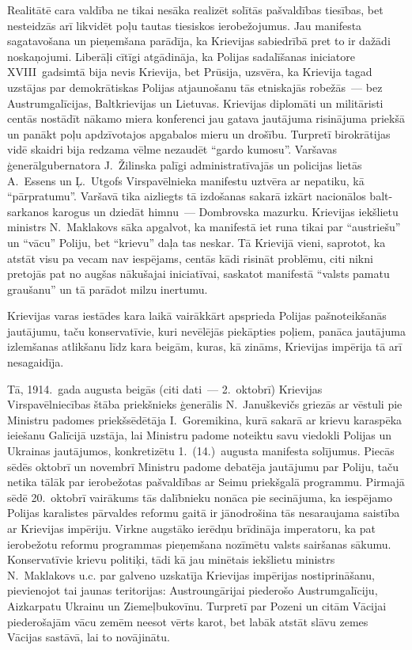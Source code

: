\documentclass[twoside,a5paper,12pt,fleqn,openany]{extbook}
\begin{document}
Realitātē cara valdība ne tikai nesāka realizēt solītās pašvaldības tiesības, bet nesteidzās arī likvidēt poļu tautas tiesiskos ierobežojumus. Jau manifesta sagatavošana un pieņemšana parādīja, ka Krievijas sabiedrībā pret to ir dažādi noskaņojumi. Liberāļi cītīgi atgādināja, ka Polijas sadalīšanas iniciatore XVIII~gadsimtā bija nevis Krievija, bet Prūsija, uzsvēra, ka Krievija tagad uzstājas par demokrātiskas Polijas atjaunošanu tās etniskajās robežās~--- bez Austrumgalīcijas, Baltkrievijas un Lietuvas. Krievijas diplomāti un militāristi centās nostādīt nākamo miera konferenci jau gatava jautājuma risinājuma priekšā un panākt poļu apdzīvotajos apgabalos mieru un drošību. Turpretī birokrātijas vidē skaidri bija redzama vēlme nezaudēt ``gardo kumosu''. Varšavas ģenerālgubernatora J.~Žilinska palīgi administratīvajās un policijas lietās A.~Essens un Ļ.~Utgofs Virspavēlnieka manifestu uztvēra ar nepatiku, kā ``pārpratumu''. Varšavā tika aizliegts tā izdošanas sakarā izkārt nacionālos balt-sarkanos karogus un dziedāt himnu~--- Dombrovska mazurku. Krievijas iekšlietu ministrs N.~Maklakovs sāka apgalvot, ka manifestā iet runa tikai par ``austriešu'' un ``vācu'' Poliju, bet ``krievu'' daļa tas neskar. Tā Krievijā vieni, saprotot, ka atstāt visu pa vecam nav iespējams, centās kādi risināt problēmu, citi nikni pretojās pat no augšas nākušajai iniciatīvai, saskatot manifestā ``valsts pamatu graušanu'' un tā parādot milzu inertumu.

Krievijas varas iestādes kara laikā vairākkārt apsprieda Polijas pašnoteikšanās jautājumu, taču konservatīvie, kuri nevēlējās piekāpties poļiem, panāca jautājuma izlemšanas atlikšanu līdz kara beigām, kuras, kā zināms, Krievijas impērija tā arī nesagaidīja.

Tā, 1914.~gada augusta beigās (citi dati~--- 2.~oktobrī) Krievijas Virspavēlniecības štāba priekšnieks ģenerālis N.~Januškevičs griezās ar vēstuli pie Ministru padomes priekšsēdētāja I.~Goremikina, kurā sakarā ar krievu karaspēka ieiešanu Galīcijā uzstāja, lai Ministru padome noteiktu savu viedokli Polijas un Ukrainas jautājumos, konkretizētu 1.~(14.)~augusta manifesta solījumus. Piecās sēdēs oktobrī un novembrī Ministru padome debatēja jautājumu par Poliju, taču netika tālāk par ierobežotas pašvaldības ar Seimu priekšgalā programmu. Pirmajā sēdē 20.~oktobrī vairākums tās dalībnieku nonāca pie secinājuma, ka iespējamo Polijas karalistes pārvaldes reformu gaitā ir jānodrošina tās nesaraujama saistība ar Krievijas impēriju. Virkne augstāko ierēdņu brīdināja imperatoru, ka pat ierobežotu reformu programmas pieņemšana nozīmētu valsts sairšanas sākumu. Konservatīvie krievu politiķi, tādi kā jau minētais iekšlietu ministrs N.~Maklakovs u.c. par galveno uzskatīja Krievijas impērijas nostiprināšanu, pievienojot tai jaunas teritorijas: Austroungārijai piederošo Austrumgalīciju, Aizkarpatu Ukrainu un Ziemeļbukovīnu. Turpretī par Pozeni un citām Vācijai piederošajām vācu zemēm neesot vērts karot, bet labāk atstāt slāvu zemes Vācijas sastāvā, lai to novājinātu.
\end{document}

